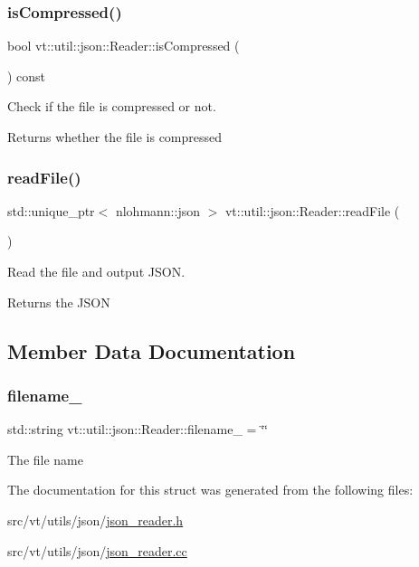 \subsubsection{\texorpdfstring{is\+Compressed()}{isCompressed()}}
{\footnotesize\ttfamily bool vt\+::util\+::json\+::\+Reader\+::is\+Compressed (\begin{DoxyParamCaption}{ }\end{DoxyParamCaption}) const}



Check if the file is compressed or not. 

\begin{DoxyReturn}{Returns}
whether the file is compressed 
\end{DoxyReturn}
\mbox{\label{structvt_1_1util_1_1json_1_1_reader_a908f4834ad9fc0d4428fcb1db53f8382}} 
\subsubsection{\texorpdfstring{read\+File()}{readFile()}}
{\footnotesize\ttfamily std\+::unique\+\_\+ptr$<$ nlohmann\+::json $>$ vt\+::util\+::json\+::\+Reader\+::read\+File (\begin{DoxyParamCaption}{ }\end{DoxyParamCaption})}



Read the file and output J\+S\+ON. 

\begin{DoxyReturn}{Returns}
the J\+S\+ON 
\end{DoxyReturn}


\subsection{Member Data Documentation}
\mbox{\label{structvt_1_1util_1_1json_1_1_reader_a291e175a92898f3cb80c2f05f1350326}} 
\subsubsection{\texorpdfstring{filename\+\_\+}{filename\_}}
{\footnotesize\ttfamily std\+::string vt\+::util\+::json\+::\+Reader\+::filename\+\_\+ = \char`\"{}\char`\"{}\hspace{0.3cm}{\ttfamily [private]}}

The file name 

The documentation for this struct was generated from the following files\+:\begin{DoxyCompactItemize}
\item 
src/vt/utils/json/\hyperlink{json__reader_8h}{json\+\_\+reader.\+h}\item 
src/vt/utils/json/\hyperlink{json__reader_8cc}{json\+\_\+reader.\+cc}\end{DoxyCompactItemize}
